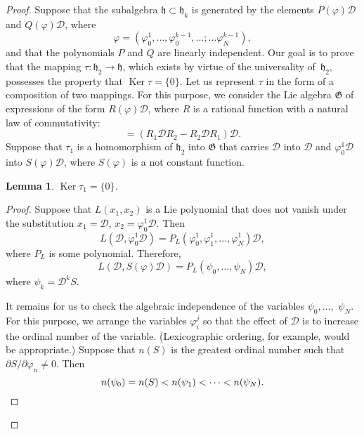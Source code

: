 \documentclass[a4paper]{article}
\newtheorem{lemma}{Lemma}
\newcommand{\Ker}{\operatorname{Ker}}
\begin{document}
\begin{proof}
	Suppose that the subalgebra $\mathfrak{h} \subset \mathfrak{h}_k$ is generated by the elements $P(\varphi) \mathscr{D}$ and $Q(\varphi) \mathscr{D}$, where
	\begin{equation*}
		\varphi = (\varphi_0^1, \dotsc, \varphi_0^{k-1}, \dotsc ; \dotsc \varphi_N^{k-1}),
	\end{equation*}
	and that the polynomials $P$ and $Q$ are linearly independent. 
	Our goal is to prove that the mapping $\tau : \mathfrak{h}_2 \to \mathfrak{h}$, which exists by virtue of the universality of~$\mathfrak{h}_2$, possesses the property that $\Ker \tau = \{ 0 \}$.
	Let us represent $\tau$ in the form of a composition of two mappings.
	For this purpose, we consider the Lie algebra $\mathfrak{G}$ of expressions of the form $R(\varphi) \mathscr{D}$, where $R$ is a rational function with a natural law of commutativity:
	\begin{equation*}
		[R_1(\varphi) \mathscr{D}, R_2(\varphi)\mathscr{D}] = (R_1 \mathscr{D} R_2 - R_2 \mathscr{D} R_1) \mathscr{D}.
	\end{equation*}
	Suppose that $\tau_1$ is a homomorphism of $\mathfrak{h}_2$ into $\mathfrak{G}$ that carries $\mathscr{D}$ into $\mathscr{D}$ and $\varphi_0^1 \mathscr{D}$ into $S(\varphi) \mathscr{D}$, where $S(\varphi)$ is a not constant function.
	
	\begin{lemma}
		\label{lem:2}
		$\Ker \tau_1 = \{ 0 \}$.
	\end{lemma}

	\begin{proof}
		Suppose that $L(x_1,x_2)$ is a Lie polynomial that does not vanish under the substitution $x_1 = \mathscr{D}$, $x_2 = \varphi_0^1 \mathscr{D}$.
		Then
		\begin{equation*}
			L(\mathscr{D}, \varphi_0^1 \mathscr{D}) = P_L(\varphi_0^1, \varphi_1^1, \dots, \varphi_N^1) \mathscr{D},
		\end{equation*}
		where $P_L$ is some polynomial. 
		Therefore,
		\begin{equation*}
			L(\mathscr{D}, S(\varphi)\mathscr{D}) = P_L(\psi_0,\dotsc,\psi_N) \mathscr{D},
		\end{equation*}
		where $\psi_k = \mathscr{D}^k S$.
		
		It remains for us to check the algebraic independence of the variables $\psi_0, \dotsc,$ $\psi_N$.
		For this purpose, we arrange the variables $\varphi_i^j$ so that the effect of $\mathscr{D}$ is to increase the ordinal number of the variable. 
		(Lexicographic ordering, for example, would be appropriate.)
		Suppose that $n(S)$ is the greatest ordinal number such that $\partial S / \partial \varphi_n \neq 0$.
		Then
		\begin{equation*}
			n(\psi_0) = n(S) < n(\psi_1) < \dotsb < n(\psi_N). \qedhere
		\end{equation*}
	\end{proof}


\end{proof}
\end{document}
